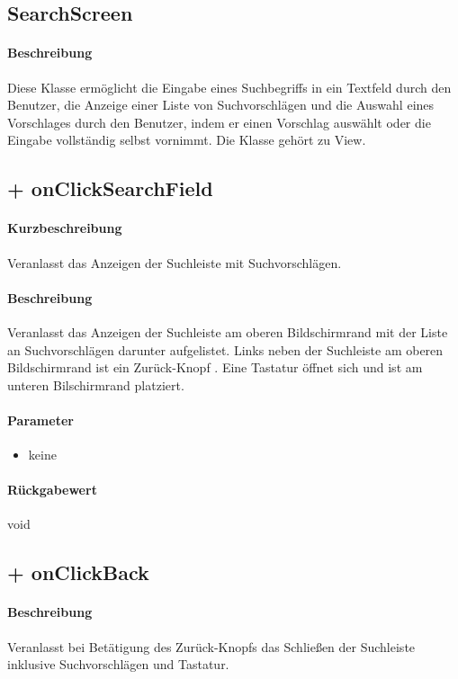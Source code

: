 \subsection{SearchScreen}
\paragraph*{Beschreibung}
Diese Klasse ermöglicht die Eingabe eines Suchbegriffs in ein Textfeld durch den Benutzer, 
die Anzeige einer Liste von Suchvorschlägen und die Auswahl eines Vorschlages durch den Benutzer, 
indem er einen Vorschlag auswählt oder die Eingabe vollständig selbst vornimmt.
Die Klasse gehört zu View.

\subsection{+ onClickSearchField}%
\paragraph*{Kurzbeschreibung}
Veranlasst das Anzeigen der Suchleiste mit Suchvorschlägen.
\paragraph*{Beschreibung}
Veranlasst das Anzeigen der Suchleiste am oberen Bildschirmrand mit der Liste an Suchvorschlägen darunter aufgelistet.
Links neben der Suchleiste am oberen Bildschirmrand ist ein \dq Zurück-Knopf \dq{}.
Eine Tastatur öffnet sich und ist am unteren Bilschirmrand platziert.
\paragraph*{Parameter}
\begin{itemize}
    \item keine
\end{itemize}
\paragraph*{Rückgabewert}
void

\subsection{+ onClickBack}%
\paragraph*{Beschreibung}
Veranlasst bei Betätigung des \dq Zurück-Knopfs \dq{} das Schließen der Suchleiste inklusive Suchvorschlägen und Tastatur.
